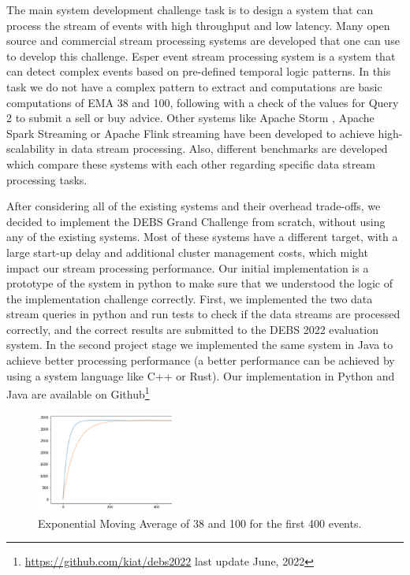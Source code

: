 The main system development challenge task is to design a system that can process the stream of events with high throughput and low latency.
Many open source and commercial stream processing systems are developed that one can use to develop this challenge.
Esper event stream processing system \cite{Bernhardt2007} is a system that can detect complex events based on pre-defined temporal logic patterns.
In this task we do not have a complex pattern to extract and computations are basic computations of EMA 38 and 100, following with a check of the values for
Query 2 to submit a sell or buy advice. Other systems like Apache Storm \cite{8288619}, Apache Spark Streaming \cite{zaharia2010spark} or
Apache Flink streaming \cite{alexandrov2014stratosphere} have been developed to achieve high-scalability in data stream processing.
Also, different benchmarks are developed \cite{8701904} which compare these systems with each other regarding specific data
stream processing tasks.

After considering all of the existing systems and their overhead trade-offs, we decided to implement the DEBS Grand Challenge from scratch,
without using any of the existing systems. Most of these systems have a different target, with a large start-up delay and additional cluster management costs, which might impact
our stream processing performance. Our initial implementation is a prototype of the system in python to make sure
that we understood the logic of the implementation challenge correctly. 
First, we implemented the two data stream queries in python and run tests to check if the data streams are processed correctly, and the correct
results are submitted to the DEBS 2022 evaluation system. In the second project stage we implemented the same system in Java to achieve better processing 
performance (a better performance can be achieved by using a system language like C++ or Rust).  
Our implementation in Python and Java are available on Github\footnote{\url{https://github.com/kiat/debs2022} last update June, 2022}



\begin{figure}[!ht]
    \begin{center}
        \includegraphics[width=0.4\textwidth]{./images/query2_example_200.png}
        \caption{Exponential Moving Average of 38 and 100 for the first 400 events.}
        \label{fig:EMA200}
    \end{center}
\end{figure}


